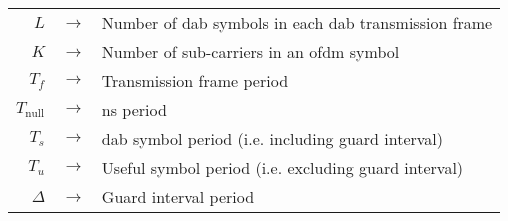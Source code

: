 \documentclass[class=report,11pt,crop=false]{standalone}
\begin{document}
{
\renewcommand{\arraystretch}{1.25}
\begin{table}[h]
    \begin{tabular}{rl}
    $L\quad\rightarrow$ & Number of \gls{dab} symbols in each \gls{dab} transmission frame\\
    $K\quad\rightarrow$ &  Number of sub-carriers in an \gls{ofdm} symbol \\
    $T_f\quad\rightarrow$ & Transmission frame period \\
    $T_\mathrm{null}\quad\rightarrow$ & \gls{ns} period \\
    $T_s\quad\rightarrow$ & \gls{dab} symbol period (i.e. including guard interval) \\
    $T_u\quad\rightarrow$ & Useful symbol period (i.e. excluding guard interval) \\
    $\Delta\quad\rightarrow$ & Guard interval period
    \end{tabular}
\end{table}
}

\ifstandalone

\fi
\end{document}

